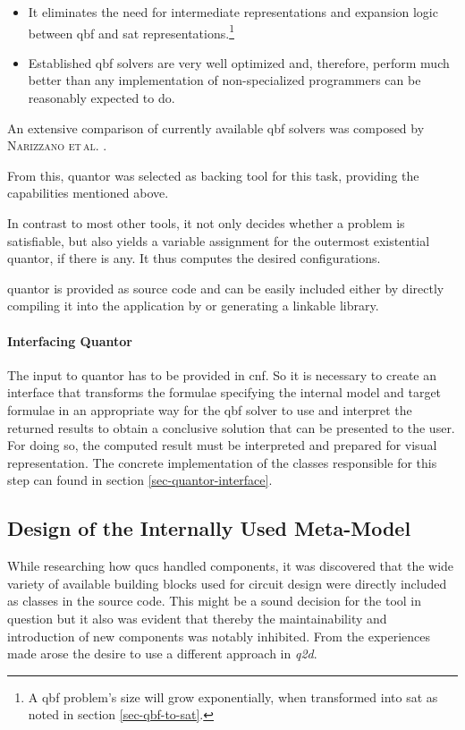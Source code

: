 	\begin{itemize}
		\item It eliminates the need for intermediate representations and expansion logic between \gls{qbf} and \gls{sat} representations.\footnote{
			A \gls{qbf} problem's size will grow exponentially, when transformed into \gls{sat} as noted in section \ref{sec-qbf-to-sat}.
		}
		\item Established \gls{qbf} solvers are very well optimized and, therefore, perform much better than any implementation of non-specialized programmers can be  reasonably expected to do.
	\end{itemize}
	
	An extensive comparison of currently available \gls{qbf} solvers was composed by \textsc{Narizzano et\,al.} \cite{qbfComparison}.	
		
	From this, \gls{quantor} was selected as backing tool for this task, providing the capabilities mentioned above.

	In contrast to most other tools, it not only decides whether a problem is satisfiable, but also yields a variable assignment for the outermost existential quantor, if there is any.
	It thus computes the desired configurations.
	
	\Gls{quantor} is provided as source code and can be easily included either by directly compiling it into the application by or generating a linkable library.
		
	\paragraph{Interfacing Quantor}
		The input to \gls{quantor} has to be provided in \gls{cnf}. 
		So it is necessary to create an interface that transforms the formulae specifying the internal model and target formulae in an appropriate way for the \gls{qbf} solver to use and interpret the returned results to obtain a conclusive solution that can be presented to the user.
		For doing so, the computed result must be interpreted and prepared for visual representation.
		The concrete implementation of the classes responsible for this step can found in section \ref{sec-quantor-interface}. 
		
		
\subsection{Design of the Internally Used Meta-Model}
	\label{sec-model-design}	
	
	While researching how \gls{qucs} handled components, it was discovered that the wide variety of available building blocks used for circuit design were directly included as classes in the source code.
	This might be a sound decision for the tool in question but it also was evident that thereby the maintainability and introduction of new components was notably inhibited.
	From the experiences made arose the desire to use a different approach in \emph{q2d}. 
			
